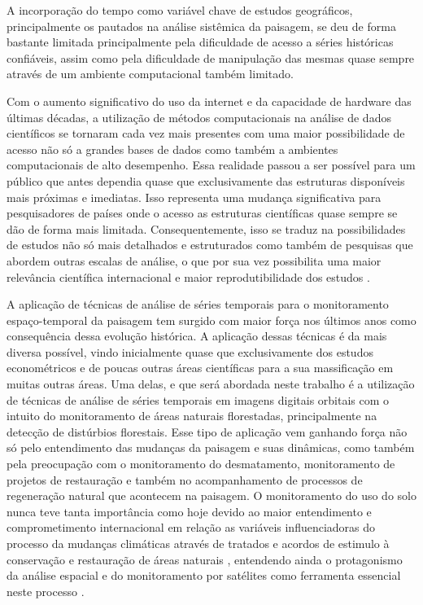 \documentclass[12pt,a4paper]{article}
\begin{document}
\hspace{13pt} A incorporação do tempo como variável chave de estudos geográficos, principalmente os pautados na análise sistêmica da paisagem, se deu de forma bastante limitada principalmente pela dificuldade de acesso a séries históricas confiáveis, assim como pela dificuldade de manipulação das mesmas quase sempre através de um ambiente computacional também limitado.

Com o aumento significativo do uso da internet e da capacidade de hardware das últimas décadas, a utilização de métodos computacionais na análise de dados científicos se tornaram cada vez mais presentes com uma maior possibilidade de acesso não só a grandes bases de dados como também a ambientes computacionais de alto desempenho. Essa realidade passou a ser possível para um público que antes dependia quase que exclusivamente das estruturas disponíveis mais próximas e imediatas. Isso representa uma mudança significativa para pesquisadores de países onde o acesso as estruturas científicas quase sempre se dão de forma mais limitada. Consequentemente, isso se traduz na possibilidades de estudos não só mais detalhados e estruturados como também de pesquisas que abordem outras escalas de análise, o que por sua vez possibilita uma maior relevância científica internacional e maior reprodutibilidade dos estudos \citep{ArribasBel2018}.

A aplicação de técnicas de análise de séries temporais para o monitoramento espaço-temporal da paisagem tem surgido com maior força nos últimos anos como consequência dessa evolução histórica. A aplicação dessas técnicas é da mais diversa possível, vindo inicialmente quase que exclusivamente dos estudos econométricos e de poucas outras áreas científicas para a sua massificação em muitas outras áreas. Uma delas, e que será abordada neste trabalho é a utilização de técnicas de análise de séries temporais em imagens digitais orbitais com o intuito do monitoramento de áreas naturais florestadas, principalmente na detecção de distúrbios florestais. Esse tipo de aplicação vem ganhando força não só pelo entendimento das mudanças da paisagem e suas dinâmicas, como também pela preocupação com o monitoramento do desmatamento, monitoramento de projetos de restauração e também no acompanhamento de processos de regeneração natural que acontecem na paisagem. O monitoramento do uso do solo nunca teve tanta importância como hoje devido ao maior entendimento e comprometimento internacional em relação as variáveis influenciadoras do processo da mudanças climáticas através de tratados e acordos de estimulo à conservação e restauração de áreas naturais \citep{ALMEIDA201934}, entendendo ainda o protagonismo da análise espacial e do monitoramento por satélites como ferramenta essencial neste processo \citep{WHITE2019}. 
\end{document}
